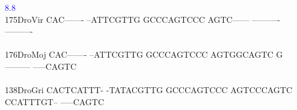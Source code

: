 \documentclass[11pt,twoside,reqno,a4paper]{article}
\begin{document}
{\hspace*{4\charwidth}\hspace*{7\charwidth}\hspace*{1\charwidth}\hspace*{1\charwidth}\hspace*{23\charwidth}\textcolor{Blue}{8.8}\hspace*{1\charwidth}\hspace*{1\charwidth}\hspace*{1\charwidth}\hspace*{1\charwidth}\\
175\hspace*{1\charwidth}DroVir	CAC-------	--ATTCGTTG	GCCCAGTCCC	AGTC------	----------	----------	\\
\hspace*{4\charwidth}\hspace*{7\charwidth}\hspace*{1\charwidth}\hspace*{1\charwidth}\hspace*{1\charwidth}\hspace*{1\charwidth}\hspace*{1\charwidth}\hspace*{1\charwidth}\\
176\hspace*{1\charwidth}DroMoj	CAC-------	--ATTCGTTG	GCCCAGTCCC	AGTGGCAGTC	G---------	-----CAGTC	\\
\hspace*{4\charwidth}\hspace*{7\charwidth}\hspace*{1\charwidth}\hspace*{1\charwidth}\hspace*{1\charwidth}\hspace*{1\charwidth}\hspace*{1\charwidth}\hspace*{1\charwidth}\\
138\hspace*{1\charwidth}DroGri	CACTCATTT-	-TATACGTTG	GCCCAGTCCC	AGTCCCAGTC	CCATTTGT--	-----CAGTC	\\
\hspace*{4\charwidth}\hspace*{7\charwidth}\hspace*{1\charwidth}\hspace*{1\charwidth}\hspace*{1\charwidth}\hspace*{1\charwidth}\hspace*{1\charwidth}\hspace*{1\charwidth}\\
}
\end{document}
